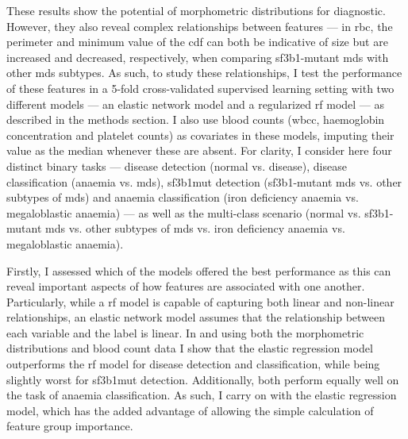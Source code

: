 These results show the potential of morphometric distributions for diagnostic. However, they also reveal complex relationships between features --- in \ac{rbc}, the perimeter and minimum value of the \ac{cdf} can both be indicative of size but are increased and decreased, respectively, when comparing \ac{sf3b1}-mutant \ac{mds} with other \ac{mds} subtypes. As such, to study these relationships, I test the performance of these features in a 5-fold cross-validated supervised learning setting with two different models --- an elastic network model and a regularized \ac{rf} model --- as described in the methods section. I also use blood counts (\ac{wbcc}, haemoglobin concentration and platelet counts) as covariates in these models, imputing their value as the median whenever these are absent. For clarity, I consider here four distinct binary tasks --- disease detection (normal vs. disease), disease classification (anaemia vs. \ac{mds}), \ac{sf3b1}mut detection (\ac{sf3b1}-mutant \ac{mds} vs. other subtypes of \ac{mds}) and anaemia classification (iron deficiency anaemia vs. megaloblastic anaemia) --- as well as the multi-class scenario (normal vs. \ac{sf3b1}-mutant \ac{mds} vs. other subtypes of \ac{mds} vs. iron deficiency anaemia vs. megaloblastic anaemia). 

Firstly, I assessed which of the models offered the best performance as this can reveal important aspects of how features are associated with one another. Particularly, while a \ac{rf} model is capable of capturing both linear and non-linear relationships, an elastic network model assumes that the relationship between each variable and the label is linear. In  and using both the morphometric distributions and blood count data I show that the elastic regression model outperforms the \ac{rf} model for disease detection and classification, while being slightly worst for \ac{sf3b1}mut detection. Additionally, both perform equally well on the task of anaemia classification. As such, I carry on with the elastic regression model, which has the added advantage of allowing the simple calculation of feature group importance.

\begin{figure}[!ht]
    \label{fig:glmnet-vs-rf-auc}
\end{figure}

